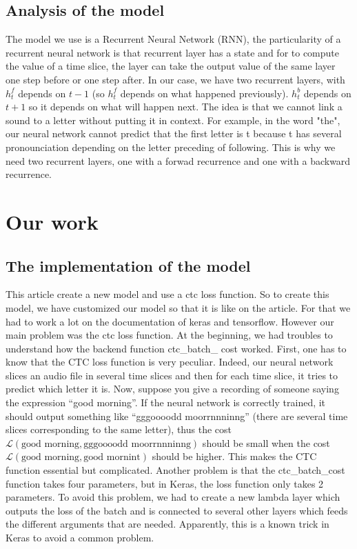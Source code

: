 \documentclass[12pt]{article}
\begin{document}
\subsection{Analysis of the model}
The model we use is a Recurrent Neural Network (RNN), the particularity of a recurrent neural network is that recurrent layer has a state and for to compute the value of a time slice, the layer can take the output value of the same layer one step before or one step after. In our case, we have two recurrent layers, with $h_t^f$ depends on $t-1$ (so $h_t^f$ depends on what happened previously). $h_t^b$ depends on $t+1$ so it depends on what will happen next. The idea is that we cannot link a sound to a letter without putting it in context. For example, in the word "the", our neural network cannot predict that the first letter is t because t has several pronounciation depending on the letter preceding of following. This is why we need two recurrent layers, one with a forwad recurrence and one with a backward recurrence.


\section{Our work}

\subsection{The implementation of the model}

This article \cite{article} create a new model and use a ctc loss function. So to create this model, we have customized our model so that it is like on the article. For that we had to work a lot on the documentation of keras and tensorflow. However our main problem was the ctc loss function. At the beginning, we had troubles to understand how the backend function ctc\_batch\_ cost worked. First, one has to know that the CTC loss function is very peculiar. Indeed, our neural network slices an audio file in several time slices and then for each time slice, it tries to predict which letter it is. Now, suppose you give a recording of someone saying the expression ``good morning''. If the neural network is correctly trained, it should output something like ``gggoooodd moorrnnninng'' (there are several time slices corresponding to the same letter), thus the cost $\mathcal{L}(\mbox{good morning}, \mbox{gggoooodd moorrnnninng})$ should be small when the cost $\mathcal{L}(\mbox{good morning}, \mbox{good mornint})$ should be higher. This makes the CTC function essential but complicated. Another problem is that the ctc\_batch\_cost function takes four parameters, but in Keras, the loss function only takes 2 parameters. To avoid this problem, we had to create a new lambda layer which outputs the loss of the batch and is connected to several other layers which feeds the different arguments that are needed. Apparently, this is a known trick in Keras to avoid a common problem.
\end{document}
